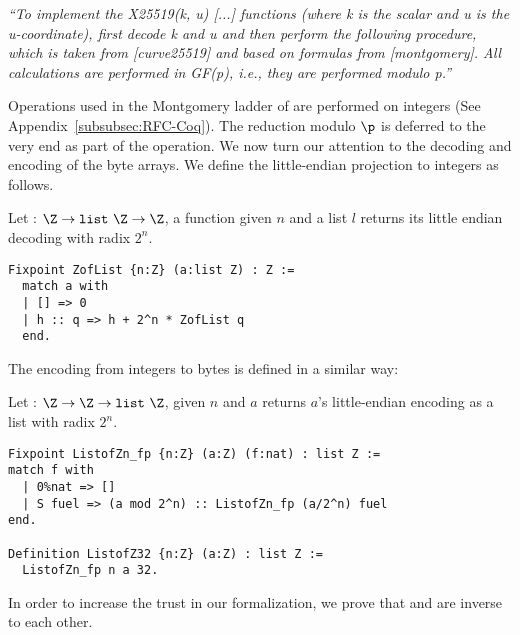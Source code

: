 
\emph{``To implement the X25519(k, u) [...] functions (where k is
the scalar and u is the u-coordinate), first decode k and u and then
perform the following procedure, which is taken from [curve25519] and
based on formulas from [montgomery].  All calculations are performed
in GF(p), i.e., they are performed modulo p.''}~\cite{rfc7748}

Operations used in the Montgomery ladder of  are performed on
integers (See Appendix~\ref{subsubsec:RFC-Coq}).
The reduction modulo $\p$ is deferred to the very end as part of the
 operation. We now turn our attention to the decoding and encoding of the byte arrays.
We define the little-endian projection to integers as follows.
\begin{dfn}
Let  : $\Z \rightarrow \texttt{list}~\Z \rightarrow \Z$,
a function given $n$ and a list $l$ returns its little endian decoding with radix $2^n$.
\end{dfn}
\begin{lstlisting}[language=Coq]
Fixpoint ZofList {n:Z} (a:list Z) : Z :=
  match a with
  | [] => 0
  | h :: q => h + 2^n * ZofList q
  end.
\end{lstlisting}

The encoding from integers to bytes is defined in a similar way:
\begin{dfn}
Let  : $\Z \rightarrow \Z \rightarrow \texttt{list}~\Z$, given
$n$ and $a$ returns $a$'s little-endian encoding as a list with radix $2^n$.
\end{dfn}
\begin{lstlisting}[language=Coq]
Fixpoint ListofZn_fp {n:Z} (a:Z) (f:nat) : list Z :=
match f with
  | 0%nat => []
  | S fuel => (a mod 2^n) :: ListofZn_fp (a/2^n) fuel
end.

Definition ListofZ32 {n:Z} (a:Z) : list Z :=
  ListofZn_fp n a 32.
\end{lstlisting}
In order to increase the trust in our formalization, we prove that
 and  are inverse to each other.

